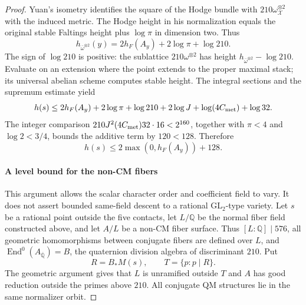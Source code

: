 \documentclass[11pt]{article}
\theoremstyle{definition}
\theoremstyle{remark}
\providecommand{\mathscr}[1]{\mathcal{#1}}
\begin{document}
\begin{proof}
Yuan's isometry \cite[Theorem 1.1 and metric definitions, pp.~2--3]{Yuan2024} identifies the square of the Hodge bundle with
$210\omega_{\mathscr X}^{\otimes2}$ with the induced metric. The Hodge
height in his normalization equals the original stable Faltings height
plus $\log\pi$ in dimension two. Thus
\[
 h_{\bar\omega^{\otimes2}}(y)=2h_F(A_y)+2\log\pi+\log210.
\]
The sign of $\log210$ is positive: the sublattice $210\omega^{\otimes2}$
has height $h_{\bar\omega^{\otimes2}}-\log210$. Evaluate on an extension
where the point extends to the proper maximal stack; its universal
abelian scheme computes stable height. The integral sections and the
supremum estimate yield
\[
 h(s)\le2h_F(A_y)+2\log\pi+\log210+2\log J
                       +\log(4C_{\rm met})+\log32.
\]
The integer comparison
$210J^2(4C_{\rm met})32\cdot16<2^{160}$, together with $\pi<4$ and
$\log2<3/4$, bounds the additive term by $120<128$. Therefore
\[
 h(s)\le2\max(0,h_F(A_y))+128.
\tag{G}\label{eq:h5-G}
\]


\paragraph{A level bound for the non-CM fibers}
\label{sec:h5-level-repair}

This argument allows the scalar character order and coefficient field to
vary. It does not assert bounded same-field descent to a rational
GL$_2$-type variety. Let $s$ be a rational point outside the five contacts,
let $L/\mathbb Q$ be the normal fiber field constructed above, and let
$A/L$ be a non-CM fiber surface. Thus $[L:\mathbb Q]\mid576$, all
geometric homomorphisms between conjugate fibers are defined over $L$,
and $\operatorname{End}^0(A_{\overline{\mathbb Q}})=B$, the quaternion
division algebra of discriminant $210$. Put
\[
 R=B_*M(s),\qquad T=\{p:p\mid R\}.
\]
The geometric argument gives that $L$ is unramified outside $T$ and
$A$ has good reduction outside the primes above $210$. All conjugate
QM structures lie in the same normalizer orbit.


\end{proof}
\end{document}
